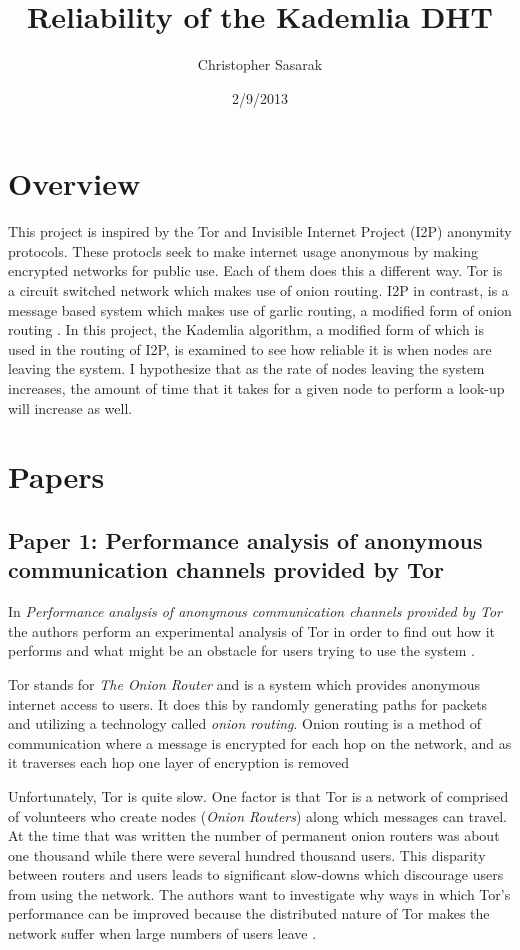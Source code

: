 \documentclass[notitlepage,12pt]{article}
\author{Christopher Sasarak}
\date{2/9/2013}
\title{Reliability of the Kademlia DHT}
\begin{document}
\maketitle

\section{Overview}
\label{sec:over}

This project is inspired by the Tor and Invisible Internet Project (I2P) anonymity protocols. These
protocls seek to make internet usage anonymous by making encrypted
networks for public use. Each of them does this a different way. Tor
is a circuit switched network which makes use of onion
routing\cite{tor}. I2P in contrast, is a message based system which
makes use of garlic routing, a modified form of onion routing
\cite{i2p}. In this project, the Kademlia algorithm, a modified form
of which is used in the routing of I2P, is examined to see how
reliable it is when nodes are leaving the system. I hypothesize that
as the rate of nodes leaving the system increases, the amount of time
that it takes for a given node to perform a look-up will increase as
well.

\section{Papers}
\label{sec:papers}

\subsection{Paper 1: Performance analysis of anonymous communication channels provided by Tor}
\label{sec:Tor}

In \emph{Performance analysis of anonymous communication channels
  provided by Tor} the authors perform an experimental analysis of Tor
in order to find out how it performs and what might be an obstacle for
users trying to use the system \cite[p.1]{tor}. 

Tor stands for \emph{The Onion Router} and is a system which provides
anonymous internet access to users. It does this by randomly
generating paths for packets and utilizing a technology called
\emph{onion routing}. Onion routing is a method of communication where
a message is encrypted for each hop on the network, and as it
traverses each hop one layer of encryption is removed \cite[p. 1]{tor}

Unfortunately, Tor is quite slow. One factor is that Tor is a network
of comprised of volunteers who create nodes (\emph{Onion Routers})
along which messages can travel\cite[p. 2]{tor}. At the time that
\cite{tor} was written the number of permanent onion routers was about
one thousand while there were several hundred thousand users. This
disparity between routers and users leads to significant slow-downs
which discourage users from using the network.  The authors want to
investigate why ways in which Tor's performance can be improved
because the distributed nature of Tor makes the network suffer when
large numbers of users leave \cite[p. 1]{tor}.



\end{document}
